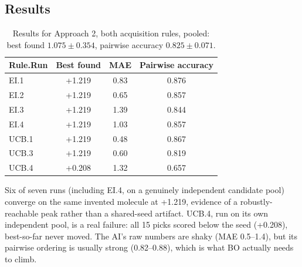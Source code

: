 \subsection{Results}
\begin{table}[h]
\centering
\begin{tabular}{lccc}
\hline
Rule.Run & Best found & MAE & Pairwise accuracy \\
\hline
EI.1  & +1.219 & 0.83 & 0.876 \\
EI.2  & +1.219 & 0.65 & 0.857 \\
EI.3  & +1.219 & 1.39 & 0.844 \\
EI.4  & +1.219 & 1.03 & 0.857 \\
UCB.1 & +1.219 & 0.48 & 0.867 \\
UCB.3 & +1.219 & 0.60 & 0.819 \\
UCB.4 & +0.208 & 1.32 & 0.657 \\
\hline
\end{tabular}
\caption{Results for Approach 2, both acquisition rules, pooled: best found $1.075 \pm 0.354$, pairwise accuracy $0.825 \pm 0.071$.}
\label{tab:results_a2}
\end{table}

Six of seven runs (including EI.4, on a genuinely independent candidate pool) converge on the same invented molecule at +1.219, evidence of a robustly-reachable peak rather than a shared-seed artifact. UCB.4, run on its own independent pool, is a real failure: all 15 picks scored below the seed (+0.208), best-so-far never moved. The AI's raw numbers are shaky (MAE 0.5--1.4), but its pairwise ordering is usually strong (0.82--0.88), which is what BO actually needs to climb.

